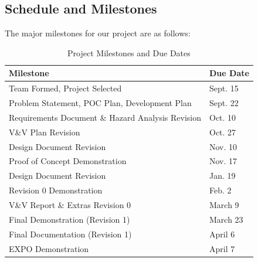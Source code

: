\documentclass{article}
\begin{document}
\subsection{Schedule and Milestones}\label{subsec:schedule}
\medskip
The major milestones for our project are as follows:
\begin{table}[htbp]
  \centering
  \begin{tabular}{|l|l|}
  \hline
  \textbf{Milestone} & \textbf{Due Date} \\ \hline
  Team Formed, Project Selected & Sept. 15 \\ \hline
  Problem Statement, POC Plan, Development Plan & Sept. 22 \\ \hline
  Requirements Document \& Hazard Analysis Revision & Oct. 10 \\ \hline
  V\&V Plan Revision & Oct. 27 \\ \hline
  Design Document Revision & Nov. 10 \\ \hline
  Proof of Concept Demonstration & Nov. 17 \\ \hline
  Design Document Revision & Jan. 19 \\ \hline
  Revision 0 Demonstration & Feb. 2 \\ \hline
  V\&V Report \& Extras Revision 0 & March 9 \\ \hline
  Final Demonstration (Revision 1) & March 23 \\ \hline
  Final Documentation (Revision 1) & April 6 \\ \hline
  EXPO Demonstration & April 7 \\ \hline
  
  \end{tabular}
  \caption{Project Milestones and Due Dates}
  \label{tab:project-milestones}
  \end{table}

\FloatBarrier
\end{document}

